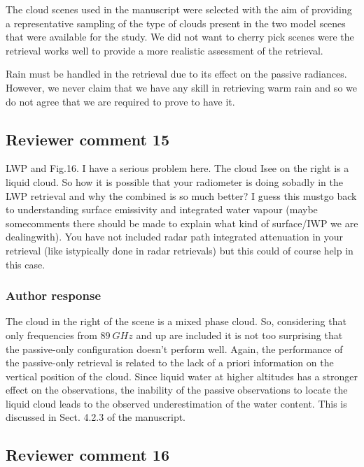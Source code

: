 \documentclass[11pt]{scrartcl}
\begin{document}
The cloud scenes used in the manuscript were selected with the aim of providing
a representative sampling of the type of clouds present in the two model scenes that
were available for the study. We did not want to cherry pick scenes were the
retrieval works well to provide a more realistic assessment of  the retrieval.

Rain must be handled in the retrieval due to its effect on the passive
radiances. However, we never claim that we have any skill in retrieving warm
rain and so we do not agree that we are required to prove to have it.

\subsection*{Reviewer comment 15}

 LWP and Fig.16. I have a serious problem here. The cloud Isee on the right is a
 liquid cloud. So how it is possible that your radiometer is doing sobadly in
 the LWP retrieval and why the combined is so much better? I guess this mustgo
 back to understanding surface emissivity and integrated water vapour (maybe
 somecomments there should be made to explain what kind of surface/IWP we are
 dealingwith). You have not included radar path integrated attenuation in your
 retrieval (like istypically done in radar retrievals) but this could of course
 help in this case.

\subsubsection*{Author response}

The cloud in the right of the scene is a mixed phase cloud. So, considering that
only frequencies from $89\ \unit{GHz}$ and up are included it is not too
surprising that the passive-only configuration doesn't perform well. Again, the
performance of the passive-only retrieval is related to the lack of a priori
information on the vertical position of the cloud. Since liquid water at higher
altitudes has a stronger effect on the observations, the inability of the
passive observations to locate the liquid cloud leads to the observed
underestimation of the water content. This is discussed in Sect. 4.2.3 of the
manuscript.

\subsection*{Reviewer comment 16}
\end{document}
